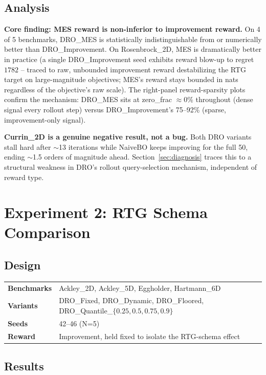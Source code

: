\documentclass[11pt]{article}
\begin{document}
\subsection{Analysis}

\textbf{Core finding: MES reward is non-inferior to improvement reward.} On
4 of 5 benchmarks, DRO\_MES is statistically indistinguishable from or
numerically better than DRO\_Improvement. On Rosenbrock\_2D, MES is dramatically
better in practice (a single DRO\_Improvement seed exhibits reward blow-up to
regret $1782$ -- traced to raw, unbounded improvement reward destabilizing the
RTG target on large-magnitude objectives; MES's reward stays bounded in nats
regardless of the objective's raw scale). The right-panel reward-sparsity plots
confirm the mechanism: DRO\_MES sits at zero\_frac $\approx 0\%$ throughout
(dense signal every rollout step) versus DRO\_Improvement's 75--92\% (sparse,
improvement-only signal).

\textbf{Currin\_2D is a genuine negative result, not a bug.} Both DRO variants
stall hard after $\sim$13 iterations while NaiveBO keeps improving for the full
50, ending $\sim$1.5 orders of magnitude ahead. Section~\ref{sec:diagnosis}
traces this to a structural weakness in DRO's rollout query-selection mechanism,
independent of reward type.

\FloatBarrier
\section{Experiment 2: RTG Schema Comparison}

\subsection{Design}

\begin{center}
\begin{tabular}{ll}
\toprule
\textbf{Benchmarks} & Ackley\_2D, Ackley\_5D, Eggholder, Hartmann\_6D \\
\textbf{Variants} & DRO\_Fixed, DRO\_Dynamic, DRO\_Floored, DRO\_Quantile\_$\{0.25,0.5,0.75,0.9\}$ \\
\textbf{Seeds} & 42--46 (N=5) \\
\textbf{Reward} & Improvement, held fixed to isolate the RTG-schema effect \\
\bottomrule
\end{tabular}
\end{center}

\subsection{Results}
\end{document}
